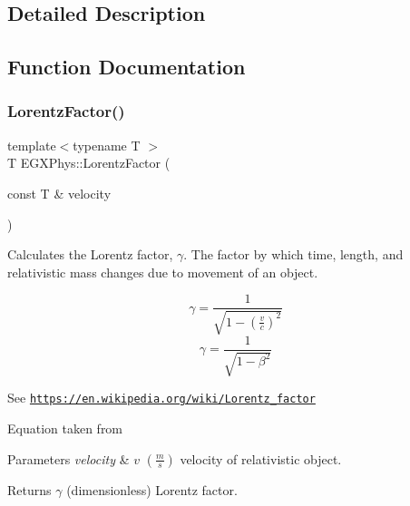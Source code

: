 \subsection{Detailed Description}


\subsection{Function Documentation}
\mbox{\label{group___e_g_x_phys-_lorentz_transformations_ga5f9b11c1f4c3ae26a7e64f02c22d5a75}} 
\subsubsection{\texorpdfstring{Lorentz\+Factor()}{LorentzFactor()}}
{\footnotesize\ttfamily template$<$typename T $>$ \\
T E\+G\+X\+Phys\+::\+Lorentz\+Factor (\begin{DoxyParamCaption}\item[{const T \&}]{velocity }\end{DoxyParamCaption})}



Calculates the Lorentz factor, $\gamma$. The factor by which time, length, and relativistic mass changes due to movement of an object. 

\[\gamma=\frac{1}{\sqrt{1-(\frac{v}{c})^2}}\] \[\gamma=\frac{1}{\sqrt{1-\beta^2}}\]

See \href{https://en.wikipedia.org/wiki/Lorentz_factor}{\tt https\+://en.\+wikipedia.\+org/wiki/\+Lorentz\+\_\+factor}

Equation taken from


\begin{DoxyParams}{Parameters}
{\em velocity} & $v$ $(\frac{m}{s})$ velocity of relativistic object. \\
\hline
\end{DoxyParams}
\begin{DoxyReturn}{Returns}
$\gamma$ (dimensionless) Lorentz factor. 
\end{DoxyReturn}
\mbox{\label{group___e_g_x_phys-_lorentz_transformations_ga601de8c039be89a9abea22bc459436c9}} 
